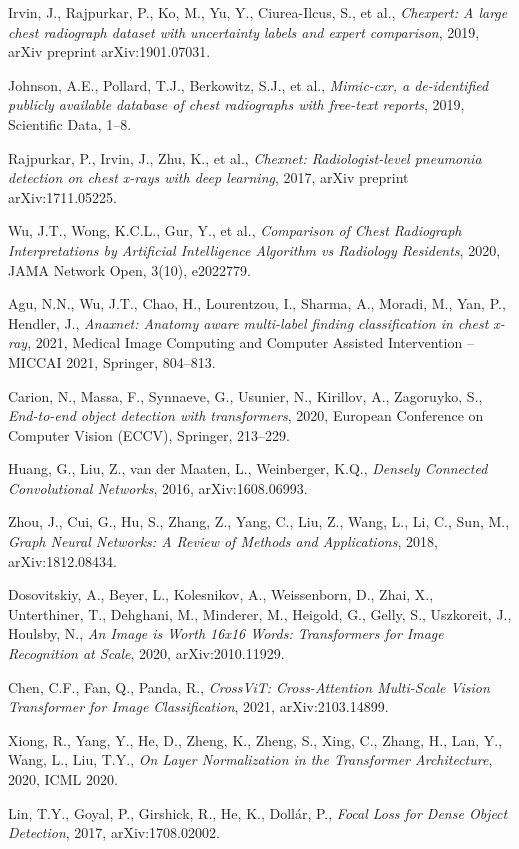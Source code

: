 \documentclass[10pt,twocolumn,letterpaper]{article}
\begin{document}
\begin{thebibliography}{99}
    Irvin, J., Rajpurkar, P., Ko, M., Yu, Y., Ciurea-Ilcus, S., et al., \textit{Chexpert: A large chest radiograph dataset with uncertainty labels and expert comparison}, 2019, arXiv preprint arXiv:1901.07031.

    Johnson, A.E., Pollard, T.J., Berkowitz, S.J., et al., \textit{Mimic-cxr, a de-identified publicly available database of chest radiographs with free-text reports}, 2019, Scientific Data, 1--8.

    Rajpurkar, P., Irvin, J., Zhu, K., et al., \textit{Chexnet: Radiologist-level pneumonia detection on chest x-rays with deep learning}, 2017, arXiv preprint arXiv:1711.05225.

    Wu, J.T., Wong, K.C.L., Gur, Y., et al., \textit{Comparison of Chest Radiograph Interpretations by Artificial Intelligence Algorithm vs Radiology Residents}, 2020, JAMA Network Open, 3(10), e2022779.

    Agu, N.N., Wu, J.T., Chao, H., Lourentzou, I., Sharma, A., Moradi, M., Yan, P., Hendler, J., \textit{Anaxnet: Anatomy aware multi-label finding classification in chest x-ray}, 2021, Medical Image Computing and Computer Assisted Intervention -- MICCAI 2021, Springer, 804--813.

    Carion, N., Massa, F., Synnaeve, G., Usunier, N., Kirillov, A., Zagoruyko, S., \textit{End-to-end object detection with transformers}, 2020, European Conference on Computer Vision (ECCV), Springer, 213--229.

    Huang, G., Liu, Z., van der Maaten, L., Weinberger, K.Q., \textit{Densely Connected Convolutional Networks}, 2016, arXiv:1608.06993.

    Zhou, J., Cui, G., Hu, S., Zhang, Z., Yang, C., Liu, Z., Wang, L., Li, C., Sun, M., \textit{Graph Neural Networks: A Review of Methods and Applications}, 2018, arXiv:1812.08434.

    Dosovitskiy, A., Beyer, L., Kolesnikov, A., Weissenborn, D., Zhai, X., Unterthiner, T., Dehghani, M., Minderer, M., Heigold, G., Gelly, S., Uszkoreit, J., Houlsby, N., \textit{An Image is Worth 16x16 Words: Transformers for Image Recognition at Scale}, 2020, arXiv:2010.11929.

    Chen, C.F., Fan, Q., Panda, R., \textit{CrossViT: Cross-Attention Multi-Scale Vision Transformer for Image Classification}, 2021, arXiv:2103.14899.

    Xiong, R., Yang, Y., He, D., Zheng, K., Zheng, S., Xing, C., Zhang, H., Lan, Y., Wang, L., Liu, T.Y., \textit{On Layer Normalization in the Transformer Architecture}, 2020, ICML 2020.

    Lin, T.Y., Goyal, P., Girshick, R., He, K., Dollár, P., \textit{Focal Loss for Dense Object Detection}, 2017, arXiv:1708.02002.
\end{thebibliography}
\end{document}
